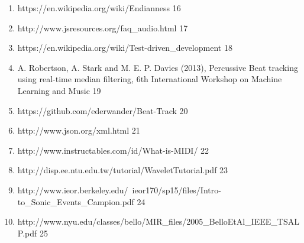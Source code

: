 \documentclass[a4paper, 11pt]{article}
\begin{document}
\begin{enumerate}
\item https://en.wikipedia.org/wiki/Endianness 16
\item http://www.jsresources.org/faq\_audio.html 17
\item https://en.wikipedia.org/wiki/Test-driven\_development 18
\item A. Robertson, A. Stark and M. E. P. Davies (2013), Percussive Beat tracking using real-time median filtering, 6th International Workshop on Machine Learning and Music 19
\item https://github.com/ederwander/Beat-Track 20
\item http://www.json.org/xml.html 21
\item http://www.instructables.com/id/What-is-MIDI/ 22
\item http://disp.ee.ntu.edu.tw/tutorial/WaveletTutorial.pdf 23
\item http://www.ieor.berkeley.edu/~ieor170/sp15/files/Intro-to\_Sonic\_Events\_Campion.pdf 24
\item http://www.nyu.edu/classes/bello/MIR\_files/2005\_BelloEtAl\_IEEE\_TSALP.pdf 25
\end{enumerate}
\end{document}
